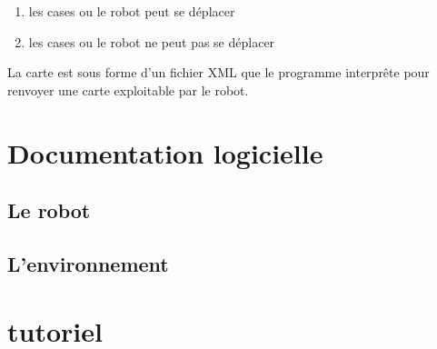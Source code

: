 \documentclass[a4paper 12pts]{article}
\begin{document}
\begin{enumerate}
	\item les cases ou le robot peut se déplacer
	\item les cases ou le robot ne peut pas se déplacer
\end{enumerate}

La carte est sous forme d'un fichier XML que le programme interprête pour renvoyer une carte exploitable par le robot.



\section{Documentation logicielle}


\subsection{Le robot}
\subsection{L'environnement}



\section{tutoriel}
\end{document}
